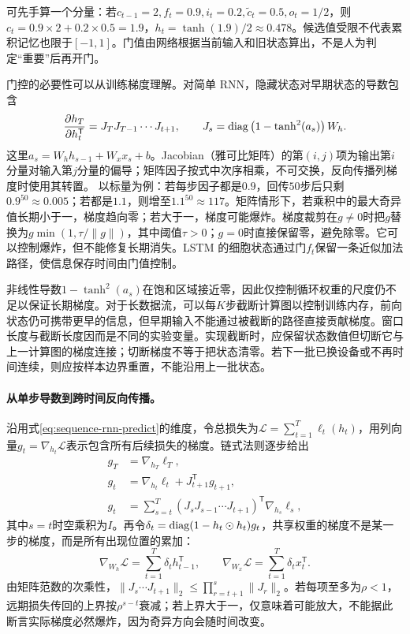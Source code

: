 可先手算一个分量：若$c_{t-1}=2,f_t=0.9,i_t=0.2,\tilde c_t=0.5,o_t=1/2$，则$c_t=0.9\times2+0.2\times0.5=1.9$，$h_t=\tanh(1.9)/2\approx0.478$。候选值受限不代表累积记忆也限于$[-1,1]$。门值由网络根据当前输入和旧状态算出，不是人为判定“重要”后再开门。

门控的必要性可以从训练梯度理解。对简单 RNN，隐藏状态对早期状态的导数包含
\begin{equation}
 \frac{\partial h_T}{\partial h_t^{\mathsf T}}=J_TJ_{T-1}\cdots J_{t+1},\qquad
 J_s=\operatorname{diag}\left(1-\tanh^2(a_s)\right)W_h.
\end{equation}
这里$a_s=W_hh_{s-1}+W_xx_s+b$。Jacobian（雅可比矩阵）的第$(i,j)$项为输出第$i$分量对输入第$j$分量的偏导；矩阵因子按式中次序相乘，不可交换，反向传播列梯度时使用其转置。
以标量为例：若每步因子都是$0.9$，回传$50$步后只剩$0.9^{50}\approx0.005$；若都是$1.1$，则增至$1.1^{50}\approx117$。矩阵情形下，若乘积中的最大奇异值长期小于一，梯度趋向零；若大于一，梯度可能爆炸。梯度裁剪在$g\ne0$时把$g$替换为$g\min(1,\tau/\|g\|)$，其中阈值$\tau>0$；$g=0$时直接保留零，避免除零。它可以控制爆炸，但不能修复长期消失。LSTM 的细胞状态通过门$f_t$保留一条近似加法路径，使信息保存时间由门值控制。

非线性导数$1-\tanh^2(a_s)$在饱和区域接近零，因此仅控制循环权重的尺度仍不足以保证长期梯度。对于长数据流，可以每$K$步截断计算图以控制训练内存，前向状态仍可携带更早的信息，但早期输入不能通过被截断的路径直接贡献梯度。窗口长度与截断长度因而是不同的实验变量。实现截断时，应保留状态数值但切断它与上一计算图的梯度连接；切断梯度不等于把状态清零。若下一批已换设备或不再时间连续，则应按样本边界重置，不能沿用上一批状态。

\paragraph{从单步导数到跨时间反向传播。}
沿用式\eqref{eq:sequence-rnn-predict}的维度，令总损失为$\mathcal L=\sum_{t=1}^T\ell_t(h_t)$，用列向量$g_t=\nabla_{h_t}\mathcal L$表示包含所有后续损失的梯度。链式法则逐步给出
\begin{align}
 g_T&=\nabla_{h_T}\ell_T,\\
 g_t&=\nabla_{h_t}\ell_t+J_{t+1}^{\mathsf T}g_{t+1},\\
 g_t&=\sum_{s=t}^T(J_sJ_{s-1}\cdots J_{t+1})^{\mathsf T}\nabla_{h_s}\ell_s,
\end{align}
其中$s=t$时空乘积为$I$。再令$\delta_t=\operatorname{diag}(1-h_t\odot h_t)g_t$，共享权重的梯度不是某一步的梯度，而是所有出现位置的累加：
\begin{equation}
 \nabla_{W_h}\mathcal L=\sum_{t=1}^T\delta_t h_{t-1}^{\mathsf T},\qquad
 \nabla_{W_x}\mathcal L=\sum_{t=1}^T\delta_t x_t^{\mathsf T}.
\end{equation}
由矩阵范数的次乘性，$\|J_s\cdots J_{t+1}\|_2\leq\prod_{r=t+1}^s\|J_r\|_2$。若每项至多为$\rho<1$，远期损失传回的上界按$\rho^{s-t}$衰减；若上界大于一，仅意味着可能放大，不能据此断言实际梯度必然爆炸，因为奇异方向会随时间改变。


